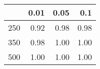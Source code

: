 % 
\begin{tabular}{rrrr}
  \hline
 & 0.01 & 0.05 & 0.1 \\ 
  \hline
250 & 0.92 & 0.98 & 0.98 \\ 
  350 & 0.98 & 1.00 & 1.00 \\ 
  500 & 1.00 & 1.00 & 1.00 \\ 
   \hline
\end{tabular}

